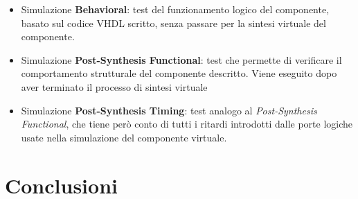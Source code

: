 \documentclass{article}
\begin{document}
\begin{itemize}

\item Simulazione \textbf{Behavioral}: test del funzionamento logico del componente, basato sul codice VHDL scritto, senza passare per la sintesi virtuale del componente.

\item Simulazione \textbf{Post-Synthesis Functional}: test che permette di verificare il comportamento strutturale del componente descritto. Viene eseguito dopo aver terminato il processo di sintesi virtuale

\item Simulazione \textbf{Post-Synthesis Timing}: test analogo al \textit{Post-Synthesis Functional}, che tiene però conto di tutti i ritardi introdotti dalle porte logiche usate nella simulazione del componente virtuale.

\end{itemize}




\section{Conclusioni}
\end{document}
